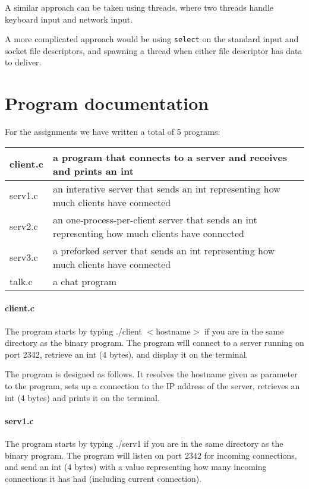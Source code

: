 \documentclass[a4paper,10pt]{article}
\begin{document}
A similar approach can be taken using threads, where two threads handle keyboard input and network input.

A more complicated approach would be using \texttt{select} on the standard input and socket file descriptors, and spawning a thread when either file descriptor has data to deliver.

\section{Program documentation}

For the assignments we have written a total of 5 programs:
\begin{center}
\begin{tabular}{ l | p{9cm} }
client.c & a program that connects to a server and receives and prints an int \\ \hline
serv1.c & an interative server that sends an int representing how much clients have connected \\ \hline
serv2.c & an one-process-per-client server that sends an int representing how much clients have connected \\ \hline
serv3.c & a preforked server that sends an int representing how much clients have connected \\ \hline
talk.c & a chat program
\end{tabular}
\end{center}

\paragraph{client.c}
The program starts by typing ./client $<$hostname$>$ if you are in the
same directory as the binary program. The program will connect to a
server running on port 2342, retrieve an int (4 bytes), and display it
on the terminal.

The program is designed as follows. It resolves the hostname given as
parameter to the program, sets up a connection to the IP address of
the server, retrieves an int (4 bytes) and prints it on the
terminal.

\paragraph{serv1.c}
The program starts by typing ./serv1 if you are in the same directory as the binary program. The program will listen on port 2342 for incoming connections, and send an int (4 bytes) with a value representing how many incoming connections it has had (including current connection).
\end{document}
